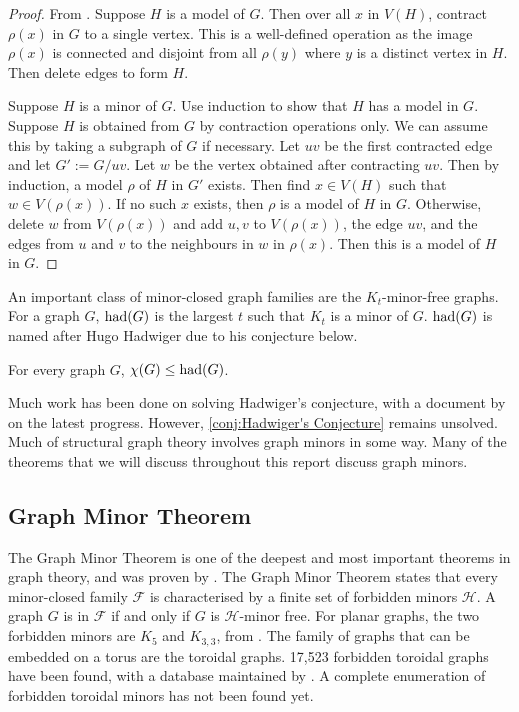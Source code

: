 \begin{proof}
	From \textcite{norinMath599GraphMinors2017}. Suppose \(H\) is a model of \(G\). Then over all \(x\) in \(V(H)\), contract \(\rho(x)\) in \(G\) to a single vertex. This is a well-defined operation as the image $\rho(x)$ is connected and disjoint from all $\rho(y)$ where $y$ is a distinct vertex in $H$. Then delete edges to form \(H\).

	Suppose $H$ is a minor of $G$. Use induction to show that \(H\) has a model in \(G\). Suppose \(H\) is obtained from \(G\) by contraction operations only. We can assume this by taking a subgraph of \(G\) if necessary. Let \(uv\) be the first contracted edge and let \(G' := G / uv\). Let \(w\) be the vertex obtained after contracting \(uv\). Then by induction, a model \(\rho\) of \(H\) in \(G'\) exists. Then find $x \in V(H)$ such that $w \in V(\rho(x))$. If no such $x$ exists, then $\rho$ is a model of $H$ in $G$. Otherwise, delete \(w\) from \(V(\rho(x)) \) and add $u, v$ to $V(\rho(x))$, the edge $uv$, and the edges from $u$ and $v$ to the neighbours in $w$ in $\rho(x)$. Then this is a model of \(H\) in \(G\). 
\end{proof}

An important class of minor-closed graph families are the \(K_t\)-minor-free graphs. For a graph \(G\), \(\operatorname{had}(G)\) is the largest \(t\) such that \(K_t\) is a minor of \(G\). $\operatorname{had}(G)$ is named after Hugo Hadwiger due to his conjecture below.
\begin{conjecture}\label{conj:Hadwiger's Conjecture}
	For every graph \(G\), \(\chi(G) \leq \operatorname{had}(G)\).
\end{conjecture}
Much work has been done on solving Hadwiger's conjecture, with a document by \textcite{seymourHadwigersConjecture2016} on the latest progress. However, \cref{conj:Hadwiger's Conjecture} remains unsolved. Much of structural graph theory involves graph minors in some way. Many of the theorems that we will discuss throughout this report discuss graph minors. 

 \subsection{Graph Minor Theorem}
The Graph Minor Theorem is one of the deepest and most important theorems in graph theory, and was proven by \textcite{robertsonGraphMinorsXX2004}. The Graph Minor Theorem states that every minor-closed family $\mathcal{F}$ is characterised by a finite set of forbidden minors $\mathcal{H}$. A graph $G$ is in $\mathcal{F}$ if and only if $G$ is $\mathcal{H}$-minor free.
For planar graphs, the two forbidden minors are \(K_5\) and \(K_{3,3}\), from \textcite{wagnerUeberEigenschaftEbenen1937}. 
The family of graphs that can be embedded on a torus are the toroidal graphs.  17,523 forbidden toroidal graphs have been found, with a database maintained by \textcite{myrvoldLargeSetTorus2018}. A complete enumeration of forbidden toroidal minors has not been found yet.

